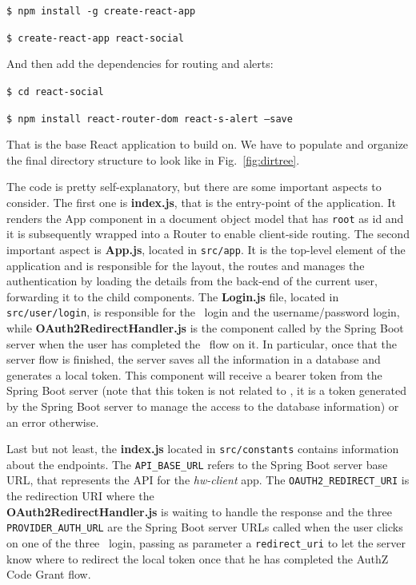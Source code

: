  \texttt{\$ npm install -g create-react-app}
  
  \texttt{\$ create-react-app react-social}

\noindent And then add the dependencies for routing and alerts:

  \texttt{\$ cd react-social}
  
  \texttt{\$ npm install react-router-dom react-s-alert --save}

\noindent That is the base React application to build on. We have to populate and organize the final directory structure to look like in Fig.~\ref{fig:dirtree}.

The code is pretty self-explanatory, but there are some important aspects to consider. The first one is \textbf{index.js}, that is the entry-point of the application. It renders the App component in a document object model that has \texttt{root} as id and it is subsequently wrapped into a Router to enable client-side routing. The second important aspect is \textbf{App.js}, located in \texttt{src/app}. It is the top-level element of the application and is responsible for the layout, the routes and manages the authentication by loading the details from the back-end of the current user, forwarding it to the child components. The \textbf{Login.js} file, located in \texttt{src/user/login}, is responsible for the \oauth\ login and the username/password login, while \textbf{OAuth2RedirectHandler.js} is the component called by the Spring Boot server when the user has completed the \oauth\ flow on it. In particular, once that the server flow is finished, the server saves all the information in a database and generates a local token. This component will receive a bearer token from the Spring Boot server (note that this token is not related to \oauth, it is a token generated by the Spring Boot server to manage the access to the database information) or an error otherwise.

Last but not least, the \textbf{index.js} located in \texttt{src/constants} contains information about the endpoints. The \texttt{API\_BASE\_URL} refers to the Spring Boot server base URL, that represents the API for the \textit{hw-client} app. The \texttt{OAUTH2\_REDIRECT\_URI} is the redirection URI where the \\ \textbf{OAuth2RedirectHandler.js} is waiting to handle the response and the three \texttt{PROVIDER\_AUTH\_URL} are the Spring Boot server URLs called when the user clicks on one of the three \oauth\ login, passing as parameter a \texttt{redirect\_uri} to let the server know where to redirect the local token once that he has completed the AuthZ Code Grant flow. 

